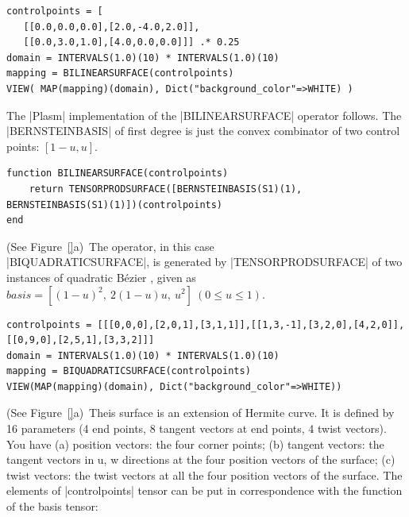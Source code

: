 \begin{coding}[Algebraic computation of FE = $\delta_1$]
\begin{condition}
\begin{lstlisting}[language=JuliaLocal, style=julia, mathescape=true]
controlpoints = [
   [[0.0,0.0,0.0],[2.0,-4.0,2.0]],
   [[0.0,3.0,1.0],[4.0,0.0,0.0]]] .* 0.25
domain = INTERVALS(1.0)(10) * INTERVALS(1.0)(10)
mapping = BILINEARSURFACE(controlpoints)
VIEW( MAP(mapping)(domain), Dict("background_color"=>WHITE) )
\end{lstlisting}
The |Plasm| implementation of the |BILINEARSURFACE| operator follows. The
|BERNSTEINBASIS| of first degree is just the convex combinator of two control points: $[1-u, u]$.
\begin{lstlisting}[language=JuliaLocal, style=julia, mathescape=true]
function BILINEARSURFACE(controlpoints)
	return TENSORPRODSURFACE([BERNSTEINBASIS(S1)(1), BERNSTEINBASIS(S1)(1)])(controlpoints)
end
\end{lstlisting}
\end{condition}

\begin{condition} (See Figure~\ref{}a)\
The operator, in this case\\ |BIQUADRATICSURFACE|, is generated by |TENSORPRODSURFACE| of two instances of  quadratic Bézier , given as 
$basis = [ (1-u)^{2},\ 2(1-u)u,\ u^{2} ]\ (0\leq u\leq 1).$

\begin{lstlisting}[language=JuliaLocal, style=julia, mathescape=true]
controlpoints = [[[0,0,0],[2,0,1],[3,1,1]],[[1,3,-1],[3,2,0],[4,2,0]],[[0,9,0],[2,5,1],[3,3,2]]]
domain = INTERVALS(1.0)(10) * INTERVALS(1.0)(10)
mapping = BIQUADRATICSURFACE(controlpoints)
VIEW(MAP(mapping)(domain), Dict("background_color"=>WHITE))
\end{lstlisting}
\end{condition}



\begin{condition}[(Bicubic Hermite surface] (See Figure~\ref{}a)\
Theis surface is an extension of Hermite curve. It is defined by 16 parameters (4 end points, 8 tangent vectors at end points, 4 twist vectors). You have (a) position vectors: the four corner points; (b) tangent vectors: the tangent vectors in u, w directions at the four position vectors of the surface; (c) twist vectors: the twist vectors at all the four position vectors of the surface. The elements of |controlpoints| tensor can be put in correspondence with the function of the basis tensor:


\end{condition}
\end{coding}
